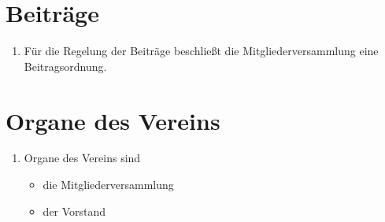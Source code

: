 \documentclass[a4paper,12pt]{scrartcl}
\begin{document}
\section{Beiträge}
\begin{enumerate}
  \item Für die Regelung der Beiträge beschließt die Mitgliederversammlung eine
    Beitragsordnung.
\end{enumerate}

\section{Organe des Vereins}
\begin{enumerate}
  \item Organe des Vereins sind
  \begin{itemize}
    \item die Mitgliederversammlung
    \item der Vorstand
  \end{itemize}
\end{enumerate}
\end{document}
